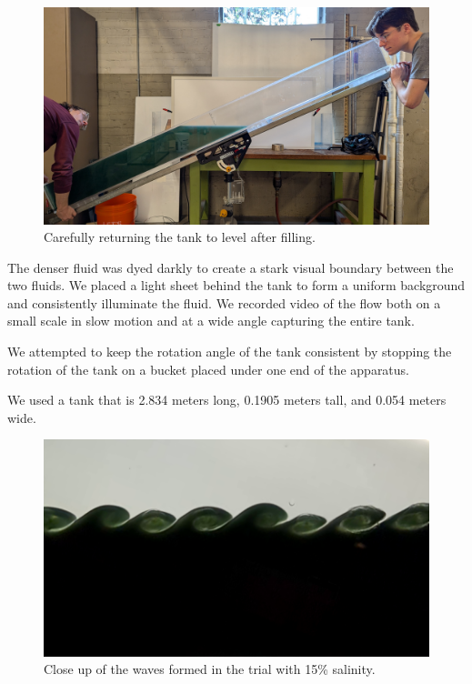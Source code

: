 \documentclass{article}
\begin{document}
\begin{figure}[h!]
    \centering
    \includegraphics[width=5in]{filling-with-salt-water-4.jpg}
    \caption{Carefully returning the tank to level after filling.}
    \label{img:leveling}
\end{figure}

The denser fluid was dyed darkly to create a stark visual boundary between the
two fluids. We placed a light sheet behind the tank to form a uniform background
and consistently illuminate the fluid. We recorded video of the flow both on a
small scale in slow motion and at a wide angle capturing the entire tank.

We attempted to keep the rotation angle of the tank consistent by stopping the
rotation of the tank on a bucket placed under one end of the apparatus.

We used a tank that is 2.834 meters long, 0.1905 meters tall, and 0.054 meters
wide.

\begin{figure}[h!]
    \centering
    \includegraphics[width=5in]{15pct-screenshot.png}
    \caption{Close up of the waves formed in the trial with 15\% salinity.}
    \label{img:15pct-waves}
\end{figure}
\end{document}
